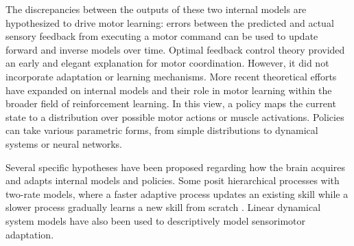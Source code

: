 \documentclass[../main.tex]{subfiles}
\begin{document}
The discrepancies between the outputs of these two internal models are hypothesized to drive motor learning: errors between the predicted and actual sensory feedback from executing a motor command can be used to update forward and inverse models over time. Optimal feedback control theory provided an early and elegant explanation for motor coordination\cite{todorovOptimalFeedbackControl2002}. However, it did not incorporate adaptation or learning mechanisms. More recent theoretical efforts have expanded on internal models and their role in motor learning within the broader field of reinforcement learning. In this view, a policy maps the current state to a distribution over possible motor actions or muscle activations. Policies can take various parametric forms, from simple distributions to dynamical systems or neural networks.

Several specific hypotheses have been proposed regarding how the brain acquires and adapts internal models and policies. Some posit hierarchical processes with two-rate models, where a faster adaptive process updates an existing skill while a slower process gradually learns a new skill from scratch \cite{smithInteractingAdaptiveProcesses2006}. Linear dynamical system models have also been used to descriptively model sensorimotor adaptation\cite{chengModelingSensorimotorLearning}.
\end{document}
